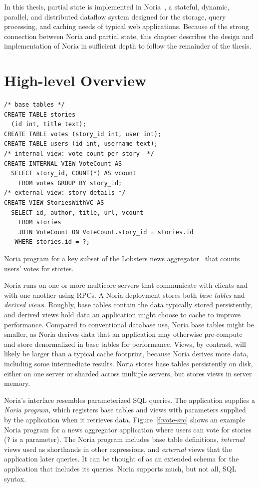 In this thesis, partial state is implemented in Noria~\cite{noria}, a stateful,
dynamic, parallel, and distributed dataflow system designed for the storage,
query processing, and caching needs of typical web applications. Because of the
strong connection between Noria and partial state, this chapter describes the
design and implementation of Noria in sufficient depth to follow the remainder
of the thesis.

\section{High-level Overview}

\begin{listing}[h]
  \begin{verbatim}
/* base tables */
CREATE TABLE stories
  (id int, title text);
CREATE TABLE votes (story_id int, user int);
CREATE TABLE users (id int, username text);
/* internal view: vote count per story  */
CREATE INTERNAL VIEW VoteCount AS
  SELECT story_id, COUNT(*) AS vcount
    FROM votes GROUP BY story_id;
/* external view: story details */
CREATE VIEW StoriesWithVC AS
  SELECT id, author, title, url, vcount
    FROM stories
    JOIN VoteCount ON VoteCount.story_id = stories.id
   WHERE stories.id = ?;
  \end{verbatim}
  \caption{Noria program for a key subset of the Lobsters news
           aggregator~\cite{lobsters} that counts users' votes for stories.}
  \label{f:vote-src}
\end{listing}

Noria runs on one or more multicore servers that communicate with clients and
with one another using RPCs. A Noria deployment stores both \emph{base tables}
and \emph{derived views}. Roughly, base tables contain the data typically stored
persistently, and derived views hold data an application might choose to cache
to improve performance. Compared to conventional database use, Noria base tables
might be smaller, as Noria derives data that an application may otherwise
pre-compute and store denormalized in base tables for performance. Views, by
contrast, will likely be larger than a typical cache footprint, because Noria
derives more data, including some intermediate results. Noria stores base tables
persistently on disk, either on one server or sharded across multiple servers,
but stores views in server memory.

Noria's interface resembles parameterized SQL queries. The application supplies
a \emph{Noria program}, which registers base tables and views with parameters
supplied by the application when it retrieves data. Figure~\ref{f:vote-src}
shows an example Noria program for a news aggregator application where users can
vote for stories (\texttt{?} is a parameter). The Noria program includes base
table definitions, \emph{internal} views used as shorthands in other
expressions, and \emph{external} views that the application later queries. It
can be thought of as an extended schema for the application that includes its
queries. Noria supports much, but not all, SQL syntax.

